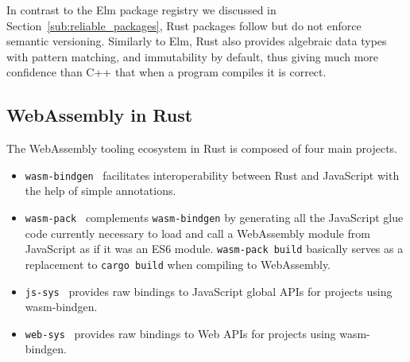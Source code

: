 In contrast to the Elm package registry we discussed in Section~\ref{sub:reliable_packages},
Rust packages follow but do not enforce semantic versioning.
Similarly to Elm, Rust also provides algebraic data types with pattern matching,
and immutability by default, thus giving much more confidence than C++
that when a program compiles it is correct.

\subsection{WebAssembly in Rust}%
\label{sub:wasm_in_rust}

The WebAssembly tooling ecosystem in Rust is composed of four main projects.
\begin{itemize}
	\item \verb|wasm-bindgen|~\cite{wasmbindgen} facilitates interoperability
		between Rust and JavaScript with the help of simple annotations.
	\item \verb|wasm-pack|~\cite{wasmpack} complements \verb|wasm-bindgen|
		by generating all the JavaScript glue code currently necessary to load and call
		a WebAssembly module from JavaScript as if it was an ES6 module.
		\verb|wasm-pack build| basically serves as a replacement to
		\verb|cargo build| when compiling to WebAssembly.
	\item \verb|js-sys|~\cite{jssys} provides raw bindings to JavaScript global APIs
		for projects using wasm-bindgen.
	\item \verb|web-sys|~\cite{websys} provides raw bindings to Web APIs
		for projects using wasm-bindgen.
\end{itemize}
